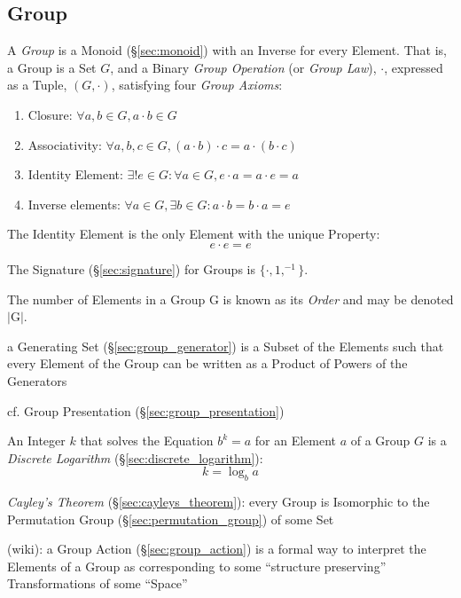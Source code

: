 \subsection{Group}\label{sec:group}

A \emph{Group} is a Monoid (\S\ref{sec:monoid}) with an Inverse for every
Element. That is, a Group is a Set $G$, and a Binary \emph{Group Operation} (or
\emph{Group Law}), $\cdot$, expressed as a Tuple, $(G,\cdot)$, satisfying four
\emph{Group Axioms}:
\begin{enumerate}
  \item Closure: $\forall a,b \in G, a \cdot b \in G$
  \item Associativity: $\forall a,b,c \in G, (a \cdot b) \cdot c = a
    \cdot (b \cdot c)$
  \item Identity Element: $\exists! e \in G : \forall a \in G,
    e \cdot a = a \cdot e = a$
  \item Inverse elements: $\forall a \in G, \exists b \in G :
    a \cdot b = b \cdot a = e$
\end{enumerate}
The Identity Element is the only Element with the unique Property:
\[
  e \cdot e = e
\]

The Signature (\S\ref{sec:signature}) for Groups is $\{\cdot, 1, ^{-1}\}$.

The number of Elements in a Group $\mathrm{G}$ is known as its \emph{Order} and
may be denoted $|\mathrm{G}|$.

a Generating Set (\S\ref{sec:group_generator}) is a Subset of the Elements such
that every Element of the Group can be written as a Product of Powers of the
Generators

\fist cf. Group Presentation (\S\ref{sec:group_presentation})

An Integer $k$ that solves the Equation $b^k = a$ for an Element $a$ of a Group
$G$ is a \emph{Discrete Logarithm} (\S\ref{sec:discrete_logarithm}):
\[
  k = \log_b a
\]

\emph{Cayley's Theorem} (\S\ref{sec:cayleys_theorem}): every Group is Isomorphic
to the Permutation Group (\S\ref{sec:permutation_group}) of some Set

(wiki): a Group Action (\S\ref{sec:group_action}) is a formal way to interpret
the Elements of a Group as corresponding to some ``structure preserving''
Transformations of some ``Space''

